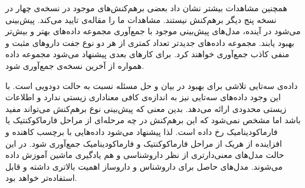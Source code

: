 همچنین مشاهدات بیشتر نشان داد بعضی برهم‌کنش‌های موجود در نسخه‌ی چهار در نسخه پنج دیگر برهم‌کنش نیستند. مشاهدات ما را مقاله‌ی
\cite{Shi J2019}
تایید می‌کند.
پیش‌بینی می‌شود در آینده، مدل‌های پیش‌بینی موجود با جمع‌آوری مجموعه داده‌های بهتر و بیش‌تر بهبود یابند. مجموعه داده‌های جدیدتر تعداد کمتری از هر دو نوع جفت داروهای مثبت و منفی کاذب جمع‌آوری خواهند‌ کرد. برای کارهای بعدی پیشنهاد می‌شود مجموعه داده همواره از آخرین نسخه‌ی
جمع‌آوری شود. 

داده‌ی سه‌تایی تلاشی برای بهبود در بیان و حل مسئله نسبت به حالت دودویی است. با این وجود داده‌ها‌ی سه‌تایی نیز به اندازه‌ی کافی معناداری زیستی ندارد و اطلاعات زیستی محدودی ارائه می‌دهد. بدین معنی که پیش‌بینی نوع برهم‌کنش می‌تواند مفید باشد اما مشخص نمی‌شود که این برهم‌کنش در چه مرحله‌ای از مراحل فارماکوکنتیک یا فارماکودینامیک رخ داده است. لذا پیشنهاد می‌شود داد‌ه‌هایی با برچسب کاهنده و افزاینده از هریک از مراحل فارماکوکنتیک و فارماکودینامیک جمع‌آوری شود. در این حالت مدل‌های معنی‌دارتری از نظر داروشناسی و هم یادگیری ماشین آموزش داده می‌شوند. مدل‌های حاصل برای داروشناس و داروساز اهمیت بالاتری داشته و قابل استفاده‌تر خواهد بود.

